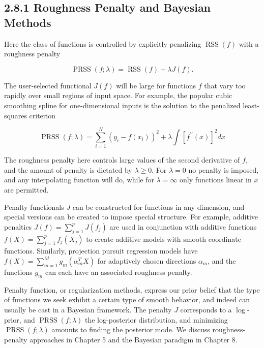 \documentclass[10pt]{article}
\begin{document}
\subsection*{2.8.1 Roughness Penalty and Bayesian Methods}
Here the class of functions is controlled by explicitly penalizing $\operatorname{RSS}(f)$ with a roughness penalty


\begin{equation*}
\operatorname{PRSS}(f ; \lambda)=\operatorname{RSS}(f)+\lambda J(f) . \tag{2.38}
\end{equation*}


The user-selected functional $J(f)$ will be large for functions $f$ that vary too rapidly over small regions of input space. For example, the popular cubic smoothing spline for one-dimensional inputs is the solution to the penalized least-squares criterion


\begin{equation*}
\operatorname{PRSS}(f ; \lambda)=\sum_{i=1}^{N}\left(y_{i}-f\left(x_{i}\right)\right)^{2}+\lambda \int\left[f^{\prime \prime}(x)\right]^{2} d x \tag{2.39}
\end{equation*}


The roughness penalty here controls large values of the second derivative of $f$, and the amount of penalty is dictated by $\lambda \geq 0$. For $\lambda=0$ no penalty is imposed, and any interpolating function will do, while for $\lambda=\infty$ only functions linear in $x$ are permitted.

Penalty functionals $J$ can be constructed for functions in any dimension, and special versions can be created to impose special structure. For example, additive penalties $J(f)=\sum_{j=1}^{p} J\left(f_{j}\right)$ are used in conjunction with additive functions $f(X)=\sum_{j=1}^{p} f_{j}\left(X_{j}\right)$ to create additive models with smooth coordinate functions. Similarly, projection pursuit regression models have $f(X)=\sum_{m=1}^{M} g_{m}\left(\alpha_{m}^{T} X\right)$ for adaptively chosen directions $\alpha_{m}$, and the functions $g_{m}$ can each have an associated roughness penalty.

Penalty function, or regularization methods, express our prior belief that the type of functions we seek exhibit a certain type of smooth behavior, and indeed can usually be cast in a Bayesian framework. The penalty $J$ corresponds to a $\log$-prior, and $\operatorname{PRSS}(f ; \lambda)$ the log-posterior distribution, and minimizing $\operatorname{PRSS}(f ; \lambda)$ amounts to finding the posterior mode. We discuss roughness-penalty approaches in Chapter 5 and the Bayesian paradigm in Chapter 8.
\end{document}
